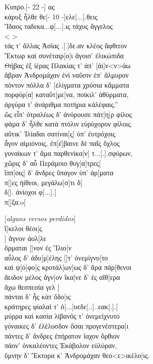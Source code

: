 \begin{gkverse}
Κυπρο.[\qquad     - 22 -\qquad       ] ας\\
κάρυξ ἦλθε θε[\qquad - 10 -\qquad  ]ελε[...].θεις\\
Ἴδαος ταδεκα...φ[...].ις τάχυς ἄγγελος\\
< \qquad			>\\
τάς τ’ ἄλλας Ἀσίας .[.]δε.αν κλέος ἄφθιτον\\
Ἔκτωρ καὶ συνέταιρ[ο]ι ἄγοισ’ ἐλικώπιδα\\
Θήβας ἐξ ἰέρας Πλακίας τ’ ἀπ’ [ἀι]ν<ν>άω\\
ἄβραν Ἀνδρομάχαν ἐνὶ ναῦσιν ἐπ’ ἄλμυρον\\
πόντον πόλλα δ’ [ἐλίγματα χρύσια κἄμματα\\
πορφύρ[α] καταΰτ[με]να, ποίκιλ’ ἀθύρματα,\\
ἀργύρα τ’ ἀνάριθμα ποτήρια κἀλέφαις.''\\
ὢς εἶπ’ ὀτραλέως δ’ ἀνόρουσε πάτ[η]ρ φίλος\\
φάμα δ’ ἦλθε κατὰ πτόλιν εὐρύχορον φίλοις.\\
αὔτικ’ Ἰλίαδαι σατίναι[ς] ὐπ’ ἐυτρόχοις\\
ἆγον αἰμιόνοις, ἐπ[έ]βαινε δὲ παῖς ὄχλος\\
γυναίκων τ’ ἄμα παρθενίκα[ν] τ...[.].σφύρων,\\
χῶρις δ’ αὖ Περάμοιο θυγ[α]τρες[\\
ἴππ[οις] δ’ ἄνδρες ὔπαγον ὐπ’ ἀρ[ματα\\
π[\qquad  ]ες ἠίθεοι, μεγάλω[σ]τι δ[\\
δ[\qquad  ]. ἀνίοχοι φ[...].[\\
π[\qquad  ]ξα.o[

\textnormal{[\textit{alguns versos perdidos}]}\\

\vinphantom{ὄρμαται [\qquad\qquad\quad}    ἴ]κελοι θέοι[ς\\
\vinphantom{ὄρμαται [\qquad\qquad\quad}     ] ἄγνον ἀολ[λε\\
ὄρμαται [\qquad\qquad\quad			     ]νον ἐς Ἴλιο[ν\\
αὖλος δ’ ἀδυ[μ]έλης [\qquad	    ]τ’ ὀνεμίγνυ[το\\
καὶ ψ[ό]φο[ς κροτάλ[ων\qquad    ]ως δ’ ἄρα πάρ[θενοι\\
ἄειδον μέλος ἄγν[ον ἴκα]νε δ’ ἐς αἴθ[ερα\\
ἄχω θεσπεσία γελ [\\
πάνται δ’ ἦς κὰτ ὄδο[ις\\
κράτηρες φίαλαί τ’ ὀ[...]υεδε[..]..εακ[.].[\\
μύρρα καὶ κασία λίβανός τ’ ὀνεμείχνυτο\\
γύναικες δ’ ἐλέλυσδον ὄσαι προγενέστερα[ι\\
πάντες δ’ ἄνδρες ἐπήρατον ἴαχον ὄρθιον\\
πάον’ ὀνκαλέοντες Ἐκάβολον εὐλύραν,\\
ὔμνην δ’ Ἔκτορα κ’ Ἀνδρομάχαν θεο<ε>ικέλο[ις.	
\end{gkverse}

